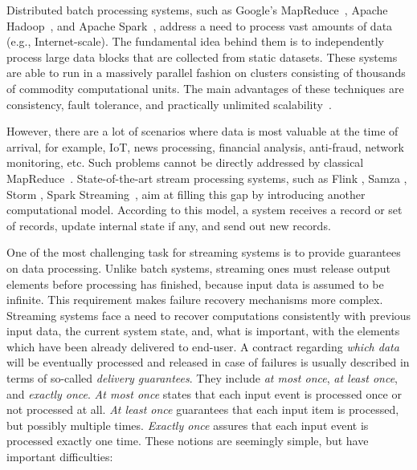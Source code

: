 
\label {fs-intro-seciton}

Distributed batch processing systems, such as Google's MapReduce~\cite{Dean:2008:MSD:1327452.1327492}, Apache Hadoop~\cite{hadoop2009hadoop}, and Apache Spark~\cite{Zaharia:2016:ASU:3013530.2934664}, address a need to process vast amounts of data (e.g., Internet-scale). The fundamental idea behind them is to independently process large data blocks that are collected from static datasets. These systems are able to run in a massively parallel fashion on clusters consisting of thousands of commodity computational units. The main advantages of these techniques are consistency, fault tolerance, and practically unlimited scalability~\cite{borthakur2011apache}.

However, there are a lot of scenarios where data is most valuable at the time of arrival, for example, IoT, news processing, financial analysis, anti-fraud, network monitoring, etc. Such problems cannot be directly addressed by classical MapReduce~\cite{Doulkeridis:2014:SLA:2628707.2628782}. State-of-the-art stream processing systems, such as Flink \cite{carbone2015apache}, Samza \cite{Noghabi:2017:SSS:3137765.3137770}, Storm \cite{apache:storm}, Spark Streaming~\cite{Zaharia:2012:DSE:2342763.2342773}, aim at filling this gap by introducing another computational model. According to this model, a system receives a record or set of records, update internal state if any, and send out new records. 

One of the most challenging task for streaming systems is to provide guarantees on data processing. Unlike batch systems, streaming ones must release output elements before processing has finished, because input data is assumed to be infinite. This requirement makes failure recovery mechanisms more complex. Streaming systems face a need to recover computations consistently with previous input data, the current system state, and, what is important, with the elements which have been already delivered to end-user. A contract regarding {\em which data} will be eventually processed and released in case of failures is usually described in terms of so-called {\em delivery guarantees}. They include {\em at most once}, {\em at least once}, and {\em exactly once}. {\it At most once} states that each input event is processed once or not processed at all. {\it At least once} guarantees that each input item is processed, but possibly multiple times. {\it Exactly once} assures that each input event is processed exactly one time. These notions are seemingly simple, but have important difficulties:

